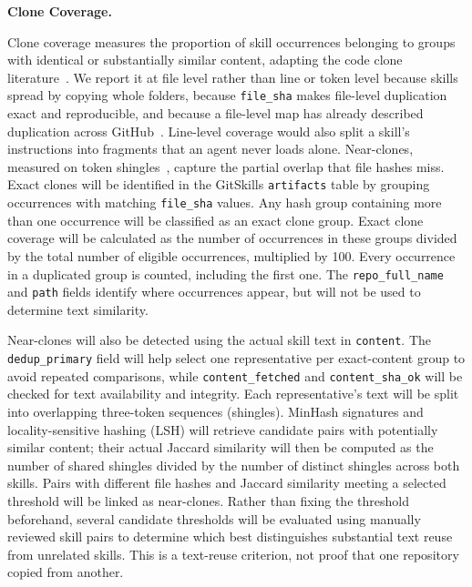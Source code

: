 \noindent\textbf{Clone Coverage.}

Clone coverage measures the proportion of skill occurrences belonging to groups with identical or substantially similar content, adapting the code clone literature~\cite{roy2009comparison,kamiya2002ccfinder}. We report it at file level rather than line or token level because skills spread by copying whole folders, because \texttt{file\_sha} makes file-level duplication exact and reproducible, and because a file-level map has already described duplication across GitHub~\cite{lopes2017dejavu}. Line-level coverage would also split a skill's instructions into fragments that an agent never loads alone. Near-clones, measured on token shingles~\cite{broder1997resemblance}, capture the partial overlap that file hashes miss. Exact clones will be identified in the GitSkills \texttt{artifacts} table by grouping occurrences with matching \texttt{file\_sha} values. Any hash group containing more than one occurrence will be classified as an exact clone group. Exact clone coverage will be calculated as the number of occurrences in these groups divided by the total number of eligible occurrences, multiplied by 100. Every occurrence in a duplicated group is counted, including the first one. The \texttt{repo\_full\_name} and \texttt{path} fields identify where occurrences appear, but will not be used to determine text similarity.

Near-clones will also be detected using the actual skill text in \texttt{content}. The \texttt{dedup\_primary} field will help select one representative per exact-content group to avoid repeated comparisons, while \texttt{content\_fetched} and \texttt{content\_sha\_ok} will be checked for text availability and integrity. Each representative's text will be split into overlapping three-token sequences (shingles). MinHash signatures and locality-sensitive hashing (LSH) will retrieve candidate pairs with potentially similar content; their actual Jaccard similarity will then be computed as the number of shared shingles divided by the number of distinct shingles across both skills. Pairs with different file hashes and Jaccard similarity meeting a selected threshold will be linked as near-clones. Rather than fixing the threshold beforehand, several candidate thresholds will be evaluated using manually reviewed skill pairs to determine which best distinguishes substantial text reuse from unrelated skills. This is a text-reuse criterion, not proof that one repository copied from another.

